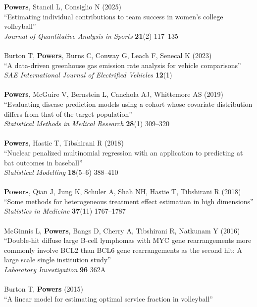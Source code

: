 \documentclass{article}
\begin{document}
{\bf Powers}, Stancil L, Consiglio N (2025)\\
``Estimating individual contributions to team success in women's college volleyball''\\
{\it Journal of Quantitative Analysis in Sports} {\bf 21}(2) 117--135\\
~\\
Burton T, {\bf Powers}, Burns C, Conway G, Leach F, Senecal K (2023)\\
``A data-driven greenhouse gas emission rate analysis for vehicle comparisons''\\
{\it SAE International Journal of Electrified Vehicles} {\bf 12}(1)\\
~\\
{\bf Powers}, McGuire V, Bernstein L, Canchola AJ, Whittemore AS (2019)\\
``Evaluating disease prediction models using a cohort whose covariate distribution differs from that of the target population''\\
{\it Statistical Methods in Medical Research} {\bf 28}(1) 309--320\\
~\\
{\bf Powers}, Hastie T, Tibshirani R (2018)\\
``Nuclear penalized multinomial regression with an application to predicting at bat outcomes in baseball''\\
{\it Statistical Modelling} {\bf 18}(5--6) 388--410\\
~\\
{\bf Powers}, Qian J, Jung K, Schuler A, Shah NH, Hastie T, Tibshirani R (2018)\\
``Some methods for heterogeneous treatment effect estimation in high dimensions''\\
{\it Statistics in Medicine} {\bf 37}(11) 1767--1787\\
~\\
McGinnis L, {\bf Powers}, Bangs D, Cherry A, Tibshirani R, Natkunam Y (2016)\\
``Double-hit diffuse large B-cell lymphomas with MYC gene rearrangements more commonly involve BCL2 than BCL6 gene rearrangements as the second hit: A large scale single institution study''\\
{\it Laboratory Investigation} {\bf 96} 362A\\
~\\
Burton T, {\bf Powers} (2015)\\
``A linear model for estimating optimal service fraction in volleyball''\\
\end{document}
